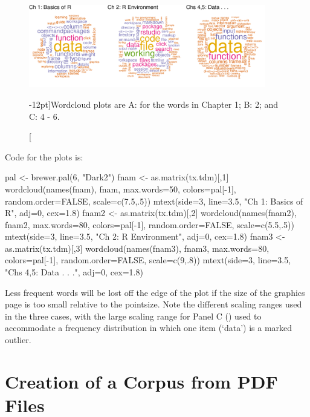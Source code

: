 \begin{figure}
\begin{Schunk}


\centerline{\includegraphics[width=0.92\textwidth]{figs/10-wordcloud1-3-1} }

\end{Schunk}
\caption[][-12pt]{Wordcloud plots are A: for the words in Chapter 1; B: 2; and C: 4 - 6.\label{fig:wc}}
\end{figure}

\vspace*{-9pt}

\noindent
Code for the plots is:
\begin{fullwidth}
\begin{Schunk}
\begin{Sinput}
pal <- brewer.pal(6, "Dark2")
fnam <- as.matrix(tx.tdm)[,1]
wordcloud(names(fnam), fnam, max.words=50, colors=pal[-1],
          random.order=FALSE, scale=c(7.5,.5))
mtext(side=3, line=3.5, "Ch 1: Basics of R", adj=0, cex=1.8)
fnam2 <- as.matrix(tx.tdm)[,2]
wordcloud(names(fnam2), fnam2, max.words=80, colors=pal[-1],
          random.order=FALSE, scale=c(5.5,.5))
mtext(side=3, line=3.5, "Ch 2: R Environment", adj=0, cex=1.8)
fnam3 <- as.matrix(tx.tdm)[,3]
wordcloud(names(fnam3), fnam3, max.words=80, colors=pal[-1],
          random.order=FALSE, scale=c(9,.8))
mtext(side=3, line=3.5, "Chs 4,5: Data . . .", adj=0, cex=1.8)
\end{Sinput}
\end{Schunk}
\end{fullwidth}
 Less frequent words will be lost off the
edge of the plot if the size of the graphics page is too small
relative to the pointsize.  Note the different scaling ranges used in
the three cases, with the large scaling range for Panel C
() used to accommodate a frequency distribution
in which one item (`data') is a marked outlier.

\section{Creation of a Corpus from PDF Files}

